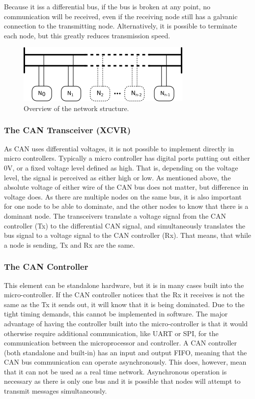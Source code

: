 Because it iss a differential bus, if the bus is broken at any point, no communication will be received, even if the receiving node still has a galvanic connection to the transmitting node.
Alternatively, it is possible to terminate each node, but this greatly reduces transmission speed.

\begin{figure}[h]
	\centering
	\includegraphics[width=.75\linewidth]{graphics/analysis_nodes}
	\caption{Overview of the network structure.}
	\label{fig:analysisnodes}
\end{figure}

\subsubsection*{The CAN Transceiver (XCVR)}
As CAN uses differential voltages, it is not possible to implement directly in micro controllers.
Typically a micro controller has digital ports putting out either $ 0 \si{\volt}$, or a fixed voltage level defined as high.
That is, depending on the voltage level, the signal is perceived as either high or low.
As mentioned above, the absolute voltage of either wire of the CAN bus does not matter, but difference in voltage does. 
As there are multiple nodes on the same bus, it is also important for one node to be able to dominate, and the other nodes to know that there is a dominant node.
The transceivers translate a voltage signal from the CAN controller (Tx) to the differential CAN signal, and simultaneously translates the bus signal to a voltage signal to the CAN controller (Rx).
That means, that while a node is sending, Tx and Rx are the same.

\subsubsection*{The CAN Controller}
This element can be standalone hardware, but it is in many cases built into the micro-controller.
If the CAN controller notices that the Rx it receives is not the same as the Tx it sends out, it will know that it is being dominated.
Due to the tight timing demands, this cannot be implemented in software.
The major advantage of having the controller built into the micro-controller is that it would otherwise require additional communication, like UART or SPI, for the communication between the microprocessor and controller.
A CAN controller (both standalone and built-in) has an input and output FIFO, meaning that the CAN bus communication can operate asynchronously.
This does, however, mean that it can not be used as a real time network.
Asynchronous operation is necessary as there is only one bus and it is possible that nodes will attempt to transmit messages simultaneously.

